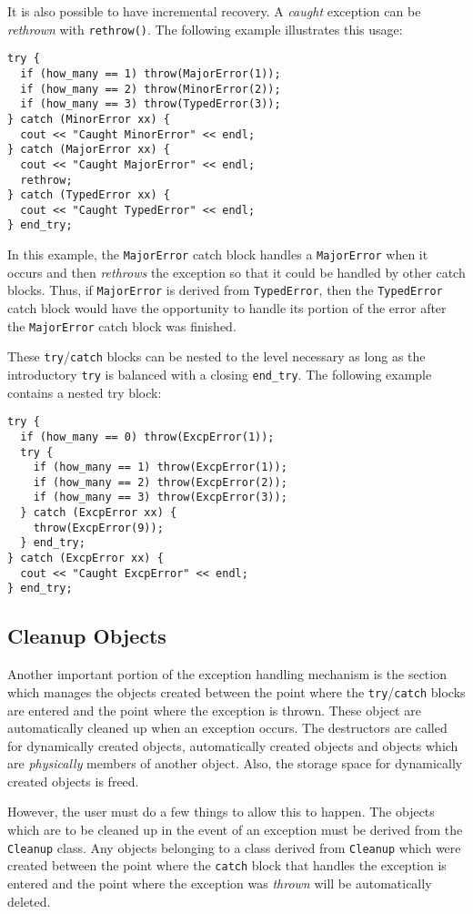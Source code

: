 It is also possible to have incremental recovery. A {\em caught} exception
can be {\em rethrown} with {\tt rethrow()}. The following example 
illustrates this usage:
\begin{verbatim}
try {
  if (how_many == 1) throw(MajorError(1));
  if (how_many == 2) throw(MinorError(2));
  if (how_many == 3) throw(TypedError(3));
} catch (MinorError xx) {
  cout << "Caught MinorError" << endl;
} catch (MajorError xx) {
  cout << "Caught MajorError" << endl;
  rethrow;
} catch (TypedError xx) {
  cout << "Caught TypedError" << endl;
} end_try;
\end{verbatim}
\noindent
In this example, the {\tt MajorError} catch block handles a {\tt MajorError}
when it occurs and then {\em rethrows} the exception so that it could be
handled by other catch blocks. Thus, if {\tt MajorError} is derived from
{\tt TypedError}, then the {\tt TypedError} catch block would have the
opportunity to handle its portion of the error after the {\tt MajorError}
catch block was finished. 

These {\tt try}/{\tt catch} blocks can be nested to the level necessary as
long as the introductory {\tt try} is balanced with a closing {\tt end\_try}.
The following example contains a nested try block:
\begin{verbatim}
try {
  if (how_many == 0) throw(ExcpError(1));
  try {
    if (how_many == 1) throw(ExcpError(1));
    if (how_many == 2) throw(ExcpError(2));
    if (how_many == 3) throw(ExcpError(3));
  } catch (ExcpError xx) {
    throw(ExcpError(9));
  } end_try;
} catch (ExcpError xx) {
  cout << "Caught ExcpError" << endl;    
} end_try;
\end{verbatim}


\subsection{Cleanup Objects}

Another important portion of the exception handling mechanism is the section
which manages the objects created between the point where the
{\tt try}/{\tt catch} blocks are entered and the point where the exception
is thrown. These object are automatically cleaned up when an exception
occurs. The destructors are called for dynamically created objects, 
automatically created objects and objects which are {\em physically} members
of another object. Also, the storage space for dynamically created objects is 
freed. 

However, the user must do a few things to allow this to happen. The
objects which are to be cleaned up in the event of an exception must be
derived from the {\tt Cleanup} class. Any objects belonging to a 
class derived from {\tt Cleanup} which were created between the point 
where the {\tt catch} block that handles the exception is entered and the
point where the exception was {\em thrown} will be automatically deleted.

